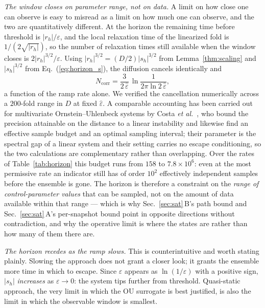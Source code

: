 \documentclass[%
 aip,
 cha,
 amsmath,amssymb,
 reprint,
 superscriptaddress,
 floatfix,
]{revtex4-2}
\newcommand{\Sig}{\hat\varepsilon}
\begin{document}
\emph{The window closes on parameter range, not on data.}  A limit on how close one can observe is easy to misread as a limit on how much one can observe, and the two are quantitatively different.  At the horizon the remaining time before threshold is $|r_h|/\varepsilon$, and the local relaxation time of the linearized fold is $1/(2\sqrt{|r_h|})$, so the number of relaxation times still available when the window closes is $2|r_h|^{3/2}/\varepsilon$.  Using $|r_h|^{3/2}=(D/2)|s_h|^{3/2}$ from Lemma~\ref{thm:scaling} and $|s_h|^{3/2}$ from Eq.~(\ref{eq:horizon_s}), the diffusion cancels identically and
\begin{equation}
\label{eq:budget}
N_{\mathrm{corr}}
=\frac{3}{2\,\Sig}\,\ln\frac{1}{2\pi\ln2\,\Sig} ,
\end{equation}
a function of the ramp rate alone.  We verified the cancellation numerically across a $200$-fold range in $D$ at fixed $\Sig$.  A comparable accounting has been carried out for multivariate Ornstein--Uhlenbeck systems by Costa \emph{et al.}~\cite{Costa2026}, who bound the precision attainable on the distance to a linear instability and likewise find an effective sample budget and an optimal sampling interval; their parameter is the spectral gap of a linear system and their setting carries no escape conditioning, so the two calculations are complementary rather than overlapping.  Over the rates of Table~\ref{tab:horizon} this budget runs from $158$ to $7.8\times10^{6}$: even at the most permissive rate an indicator still has of order $10^2$ effectively independent samples before the ensemble is gone.  The horizon is therefore a constraint on the \emph{range of control-parameter values} that can be sampled, not on the amount of data available within that range --- which is why Sec.~\ref{sec:sat}\,B's path bound and Sec.~\ref{sec:sat}\,A's per-snapshot bound point in opposite directions without contradiction, and why the operative limit is where the states are rather than how many of them there are.

\emph{The horizon recedes as the ramp slows.}  This is counterintuitive and worth stating plainly.  Slowing the approach does not grant a closer look; it grants the ensemble more time in which to escape.  Since $\varepsilon$ appears as $\ln(1/\varepsilon)$ with a positive sign, $|s_h|$ \emph{increases} as $\varepsilon\to0$: the system tips further from threshold.  Quasi-static approach, the very limit in which the OU surrogate is best justified, is also the limit in which the observable window is smallest.
\end{document}
